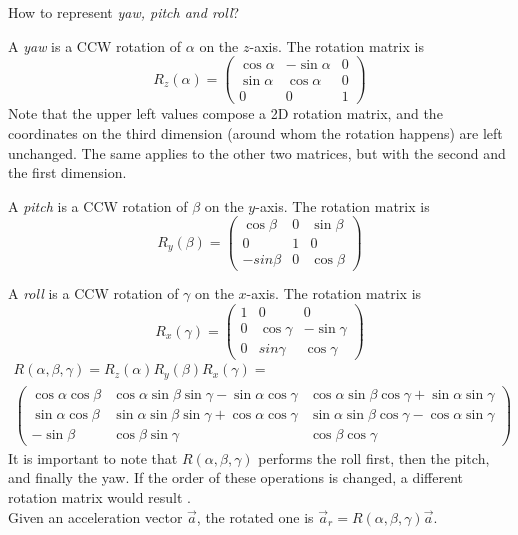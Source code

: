 How to represent \textit{yaw, pitch and roll}?
\bigbreak

A \textit{yaw} is a CCW rotation of $\alpha$ on the $z$-axis. The rotation matrix is
\[
	R_z(\alpha) =
	\begin{pmatrix}
		\cos\alpha & -\sin\alpha & 0 \\
		\sin\alpha & \cos\alpha & 0 \\
		0 & 0 & 1
	\end{pmatrix}
\]
Note that the upper left values compose a 2D rotation matrix, and the coordinates on the third dimension (around whom the rotation happens) are left unchanged. The same applies to the other two matrices, but with the second and the first dimension.
\bigbreak

A \textit{pitch} is a CCW rotation of $\beta$ on the $y$-axis. The rotation matrix is
\[
	R_y(\beta) =
	\begin{pmatrix}
		\cos\beta & 0 & \sin\beta \\
		0 & 1 & 0 \\
		-sin\beta & 0 & \cos\beta
	\end{pmatrix}
\]

A \textit{roll} is a CCW rotation of $\gamma$ on the $x$-axis. The rotation matrix is
\[
	R_x(\gamma) =
	\begin{pmatrix}
		1 & 0 & 0 \\
		0 & \cos\gamma & -\sin\gamma \\
		0 & sin\gamma & \cos\gamma
	\end{pmatrix}
\]
\begin{gather*}
	R(\alpha, \beta, \gamma) = R_z(\alpha) R_y(\beta) R_x(\gamma) = \\
	\begin{pmatrix}
		\cos\alpha \cos\beta & \cos\alpha \sin\beta \sin\gamma - \sin\alpha \cos\gamma & \cos\alpha \sin\beta \cos\gamma + \sin\alpha \sin\gamma \\
		\sin\alpha \cos\beta & \sin\alpha \sin\beta \sin\gamma + \cos\alpha \cos\gamma & \sin\alpha \sin\beta \cos\gamma - \cos\alpha \sin\gamma \\
		-\sin\beta & \cos\beta \sin\gamma & \cos\beta \cos\gamma
	\end{pmatrix}
\end{gather*}
It is important to note that $R(\alpha, \beta, \gamma)$ performs the roll first, then the pitch, and finally the yaw. If the order of these operations is changed, a different rotation matrix would result \cite{Lav06}.\\
Given an acceleration vector $\vec a$, the rotated one is $\vec a_r = R(\alpha, \beta, \gamma) \vec a$.
\bigbreak

